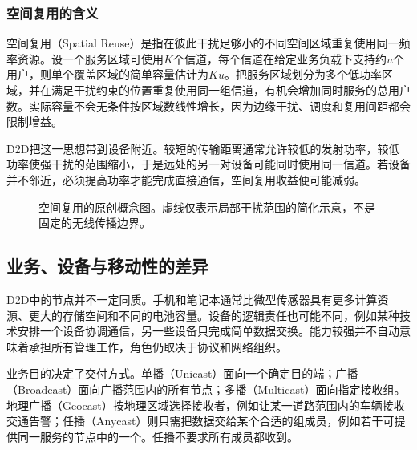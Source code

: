 \subsubsection{空间复用的含义}

空间复用（Spatial Reuse）是指在彼此干扰足够小的不同空间区域重复使用同一频率资源。设一个服务区域可使用$K$个信道，每个信道在给定业务负载下支持约$u$个用户，则单个覆盖区域的简单容量估计为$Ku$。把服务区域划分为多个低功率区域，并在满足干扰约束的位置重复使用同一组信道，有机会增加同时服务的总用户数。实际容量不会无条件按区域数线性增长，因为边缘干扰、调度和复用间距都会限制增益。

D2D把这一思想带到设备附近。较短的传输距离通常允许较低的发射功率，较低功率使强干扰的范围缩小，于是远处的另一对设备可能同时使用同一信道。若设备并不邻近，必须提高功率才能完成直接通信，空间复用收益便可能减弱。

\begin{figure}[htbp]
\centering
{}
\caption{空间复用的原创概念图。虚线仅表示局部干扰范围的简化示意，不是固定的无线传播边界。}
\label{fig:p4-reuse}
\end{figure}

\subsection{业务、设备与移动性的差异}

D2D中的节点并不一定同质。手机和笔记本通常比微型传感器具有更多计算资源、更大的存储空间和不同的电池容量。设备的逻辑责任也可能不同，例如某种技术安排一个设备协调通信，另一些设备只完成简单数据交换。能力较强并不自动意味着承担所有管理工作，角色仍取决于协议和网络组织。

业务目的决定了交付方式。单播（Unicast）面向一个确定目的端；广播（Broadcast）面向广播范围内的所有节点；多播（Multicast）面向指定接收组。地理广播（Geocast）按地理区域选择接收者，例如让某一道路范围内的车辆接收交通告警；任播（Anycast）则只需把数据交给某个合适的组成员，例如若干可提供同一服务的节点中的一个。任播不要求所有成员都收到。

